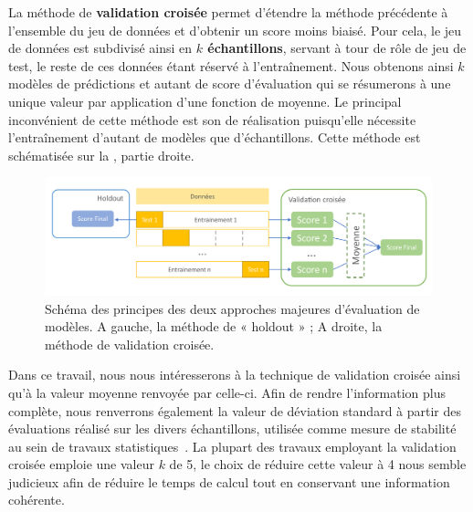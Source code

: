 La méthode de \textbf{validation croisée} permet d'étendre la méthode précédente à l'ensemble du jeu de données et d'obtenir un score moins biaisé. Pour cela, le jeu de données est subdivisé ainsi en \textbf{$k$ échantillons}, servant à tour de rôle de jeu de test, le reste de ces données étant réservé à l'entraînement. Nous obtenons ainsi $k$ modèles de prédictions et autant de score d'évaluation qui se résumerons à une unique valeur par application d'une fonction de moyenne. Le principal inconvénient de cette méthode est son de réalisation puisqu'elle nécessite l'entraînement d'autant de modèles que d'échantillons. Cette méthode est schématisée sur la \label{fig:scheme_holdout_cv}, partie droite.\par

\begin{figure}[H]
    \centering
    \includegraphics[width=\textwidth]{contents/chapter_3/resources/scheme_holdout_cv.pdf}
    \caption{Schéma des principes des deux approches majeures d'évaluation de modèles. A gauche, la méthode de « holdout » ; A droite, la méthode de validation croisée.}
    \label{fig:scheme_holdout_cv}
\end{figure}

Dans ce travail, nous nous intéresserons à la technique de validation croisée ainsi qu'à la valeur moyenne renvoyée par celle-ci. Afin de rendre l'information plus complète, nous renverrons également la valeur de déviation standard à partir des évaluations réalisé sur les divers échantillons, utilisée comme mesure de stabilité au sein de travaux statistiques~\cite{Kim2009}. La plupart des travaux employant la validation croisée emploie une valeur $k$ de 5, le choix de réduire cette valeur à 4 nous semble judicieux afin de réduire le temps de calcul tout en conservant une information cohérente.\par

